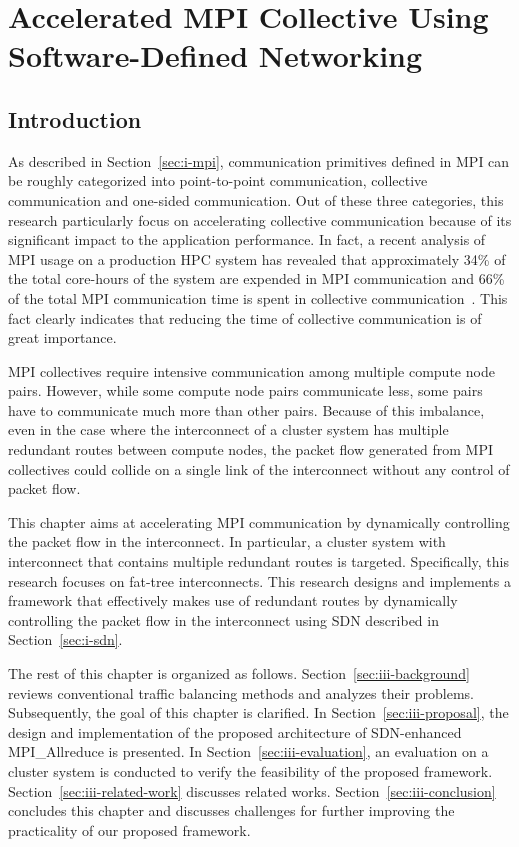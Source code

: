 \chapter{Accelerated MPI Collective Using Software-Defined Networking}\label{sec:iii}

\section{Introduction}\label{sec:iii-introduction}

As described in Section~\ref{sec:i-mpi}, communication primitives defined in
MPI can be roughly categorized into point-to-point communication, collective
communication and one-sided communication. Out of these three categories, this
research particularly focus on accelerating collective communication because
of its significant impact to the application performance. In fact, a recent
analysis of MPI usage on a production HPC system has revealed that
approximately 34\% of the total core-hours of the system are expended in MPI
communication and 66\% of the total MPI communication time is spent in
collective communication~\autocite{Chunduri2018}. This fact clearly indicates
that reducing the time of collective communication is of great importance.

MPI collectives require intensive communication among multiple compute node
pairs. However, while some compute node pairs communicate less, some pairs
have to communicate much more than other pairs. Because of this imbalance,
even in the case where the interconnect of a cluster system has multiple
redundant routes between compute nodes, the packet flow generated from MPI
collectives could collide on a single link of the interconnect without any
control of packet flow.

This chapter aims at accelerating MPI communication by dynamically
controlling the packet flow in the interconnect. In particular, a
cluster system with interconnect that contains multiple redundant routes is
targeted. Specifically, this research focuses on fat-tree interconnects. This
research designs and implements a framework that effectively makes use of
redundant routes by dynamically controlling the packet flow in the
interconnect using SDN described in Section~\ref{sec:i-sdn}.

The rest of this chapter is organized as follows.
Section~\ref{sec:iii-background} reviews conventional traffic balancing
methods and analyzes their problems. Subsequently, the goal of this chapter is
clarified. In Section~\ref{sec:iii-proposal}, the design and implementation of
the proposed architecture of SDN-enhanced MPI\_Allreduce is presented. In
Section~\ref{sec:iii-evaluation}, an evaluation on a cluster system is
conducted to verify the feasibility of the proposed framework.
Section~\ref{sec:iii-related-work} discusses related works.
Section~\ref{sec:iii-conclusion} concludes this chapter and discusses
challenges for further improving the practicality of our proposed framework.

